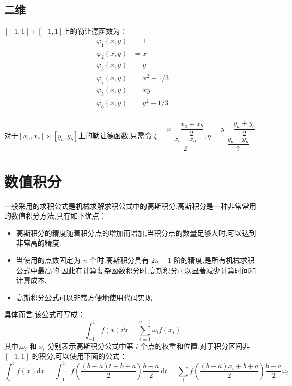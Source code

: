 \documentclass{book}
\begin{document}
\subsection{二维}
$[-1,1]\times[-1,1]$上的勒让德函数为：
\begin{equation}
    \begin{aligned}
        \varphi_{1}(x,y) & = 1       \\
        \varphi_{2}(x,y) & = x       \\
        \varphi_{3}(x,y) & = y       \\
        \varphi_{4}(x,y) & = x^2-1/3 \\
        \varphi_{5}(x,y) & = xy      \\
        \varphi_{6}(x,y) & = y^2-1/3 \\
    \end{aligned}
\end{equation}

对于$[x_a,x_b]\times[y_a,y_b]$上的勒让德函数,只需令 $\xi=\dfrac{x - \dfrac{x_a+x_b}{2}}{\dfrac{x_b-x_a}{2}},\eta = \dfrac{y - \dfrac{y_a+y_b}{2}}{\dfrac{y_b-y_a}{2}}$
\section{数值积分}

一般采用的求积公式是机械求解求积公式中的高斯积分.高斯积分是一种非常常用的数值积分方法,具有如下优点：
\begin{itemize}
    \item 高斯积分的精度随着积分点的增加而增加,当积分点的数量足够大时,可以达到非常高的精度.
    \item 当使用的点数固定为 $n$ 个时,高斯积分具有 $2n-1$ 阶的精度,是所有机械求积公式中最高的.因此在计算复杂函数积分时,高斯积分可以显著减少计算时间和计算成本.
    \item 高斯积分公式可以非常方便地使用代码实现.
\end{itemize}
具体而言,该公式可写成：
\begin{equation}
    \int_{-1}^1 f(x)\dd x=\sum_{i=1}^{n+1}\omega_if(x_i)
\end{equation}
其中,$\omega_i$ 和 $x_i$ 分别表示高斯积分公式中第 $i$ 个点的权重和位置.对于积分区间非 $[-1,1]$ 的积分,可以使用下面的公式：
\begin{equation}
    \int_{a}^{b} f(x) \mathrm{d} x=\int_{-1}^{1} f\left(\frac{(b-a) t+b+a}{2}\right) \frac{b-a}{2} \mathrm{~d} t=\sum_i f(\frac{(b-a)x_i+b+a}{2})\frac{b-a}{2}\omega_i
\end{equation}
\end{document}

